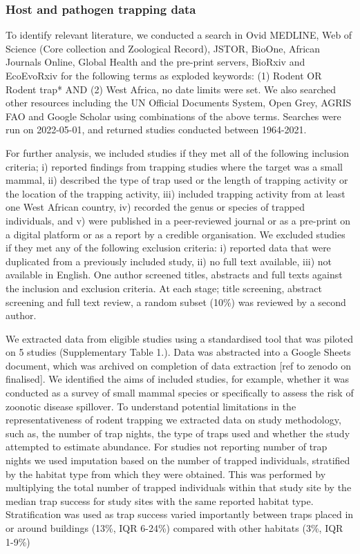 \documentclass[
]{article}
\begin{document}
\hypertarget{host-and-pathogen-trapping-data}{%
\subsubsection{Host and pathogen trapping
data}\label{host-and-pathogen-trapping-data}}

To identify relevant literature, we conducted a search in Ovid MEDLINE,
Web of Science (Core collection and Zoological Record), JSTOR, BioOne,
African Journals Online, Global Health and the pre-print servers,
BioRxiv and EcoEvoRxiv for the following terms as exploded keywords: (1)
Rodent OR Rodent trap* AND (2) West Africa, no date limits were set. We
also searched other resources including the UN Official Documents
System, Open Grey, AGRIS FAO and Google Scholar using combinations of
the above terms. Searches were run on 2022-05-01, and returned studies
conducted between 1964-2021.

For further analysis, we included studies if they met all of the
following inclusion criteria; i) reported findings from trapping studies
where the target was a small mammal, ii) described the type of trap used
or the length of trapping activity or the location of the trapping
activity, iii) included trapping activity from at least one West African
country, iv) recorded the genus or species of trapped individuals, and
v) were published in a peer-reviewed journal or as a pre-print on a
digital platform or as a report by a credible organisation. We excluded
studies if they met any of the following exclusion criteria: i) reported
data that were duplicated from a previously included study, ii) no full
text available, iii) not available in English. One author screened
titles, abstracts and full texts against the inclusion and exclusion
criteria. At each stage; title screening, abstract screening and full
text review, a random subset (10\%) was reviewed by a second author.

We extracted data from eligible studies using a standardised tool that
was piloted on 5 studies (Supplementary Table 1.). Data was abstracted
into a Google Sheets document, which was archived on completion of data
extraction {[}ref to zenodo on finalised{]}. We identified the aims of
included studies, for example, whether it was conducted as a survey of
small mammal species or specifically to assess the risk of zoonotic
disease spillover. To understand potential limitations in the
representativeness of rodent trapping we extracted data on study
methodology, such as, the number of trap nights, the type of traps used
and whether the study attempted to estimate abundance. For studies not
reporting number of trap nights we used imputation based on the number
of trapped individuals, stratified by the habitat type from which they
were obtained. This was performed by multiplying the total number of
trapped individuals within that study site by the median trap success
for study sites with the same reported habitat type. Stratification was
used as trap success varied importantly between traps placed in or
around buildings (13\%, IQR 6-24\%) compared with other habitats (3\%,
IQR 1-9\%)
\end{document}
